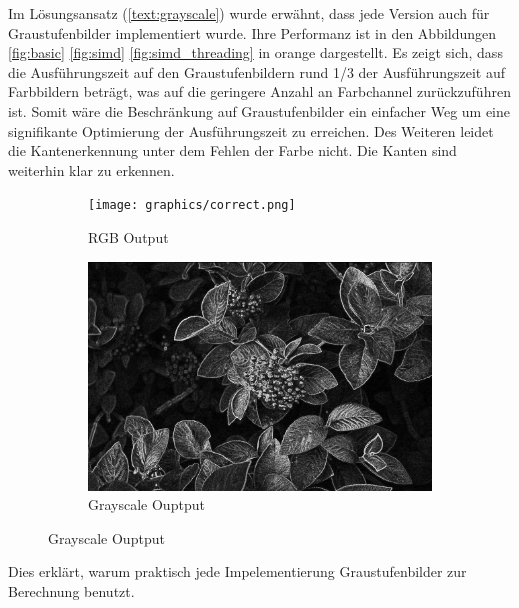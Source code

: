 \documentclass[course=erap]{aspdoc}
\begin{document}
Im Lösungsansatz (\ref{text:grayscale}) wurde erwähnt, dass jede Version auch für Graustufenbilder implementiert wurde.
Ihre Performanz ist in den Abbildungen \ref{fig:basic} \ref{fig:simd} \ref{fig:simd_threading} in orange dargestellt.
Es zeigt sich, dass die Ausführungszeit auf den Graustufenbildern rund 1/3 der Ausführungszeit auf Farbbildern beträgt, was auf die geringere Anzahl an Farbchannel zurückzuführen ist.
Somit wäre die Beschränkung auf Graustufenbilder ein einfacher Weg um eine signifikante Optimierung der Ausführungszeit zu erreichen.
Des Weiteren leidet die Kantenerkennung unter dem Fehlen der Farbe nicht. Die Kanten sind weiterhin klar zu erkennen.
\begin{figure}[H]
    \label{fig:simd_threading_results}
    \begin{subfigure}{.5\columnwidth}
        \centering
        \texttt{[image: graphics/correct.png]}
        \caption{RGB Output}
        \label{fig:correct_rgb}
    \end{subfigure}
    \begin{subfigure}{.5\columnwidth}
        \centering
        \includegraphics[width=\columnwidth]{graphics/correct_gray.png}
        \caption{Grayscale Ouptput}
        \label{fig:correct_graysc}
    \end{subfigure}
\end{figure}
Dies erklärt, warum praktisch jede Impelementierung Graustufenbilder zur Berechnung benutzt.
\end{document}
